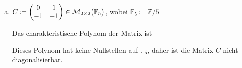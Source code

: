 \documentclass{scrreprt}
\begin{document}
\begin{enumerate}[(a)]
\item $C \coloneqq \begin{pmatrix}
    0 & 1 \\
    -1 & -1 \\
  \end{pmatrix} \in \mathcal{M}_{2 \times 2}\qty\big(\mathbb{F}_5)$, wobei
  $\mathbb{F}_5 \coloneqq \mathbb{Z}/5$

  Das charakteristische Polynom der Matrix ist
  Dieses Polynom hat keine Nullstellen auf $\mathbb{F}_5$, daher ist die Matrix
  $C$ nicht diagonalisierbar.
\end{enumerate}
\end{document}
